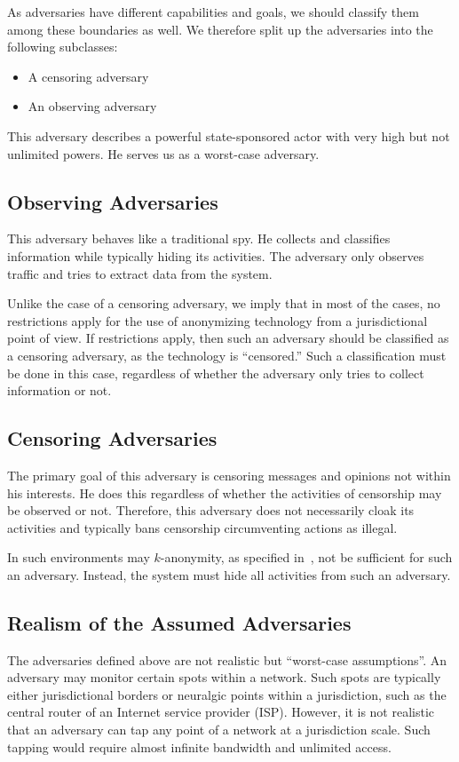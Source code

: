 As adversaries have different capabilities and goals, we should classify them among these boundaries as well. We therefore split up the adversaries into the following subclasses:
\begin{itemize}
	\item A censoring adversary
	\item An observing adversary
\end{itemize}

This adversary describes a powerful state-sponsored actor with very high but not unlimited powers. He serves us as a worst-case adversary.

\subsection{Observing Adversaries}
This adversary behaves like a traditional spy. He collects and classifies information while typically hiding its activities. The adversary only observes traffic and tries to extract data from the system.

Unlike the case of a censoring adversary, we imply that in most of the cases, no restrictions apply for the use of anonymizing technology from a jurisdictional point of view. If restrictions apply, then such an adversary should be classified as a censoring adversary, as the technology is ``censored.'' Such a classification must be done in this case, regardless of whether the adversary only tries to collect information or not.

\subsection{Censoring Adversaries}
The primary goal of this adversary is censoring messages and opinions not within his interests. He does this regardless of whether the activities of censorship may be observed or not. Therefore, this adversary does not necessarily cloak its activities and typically bans censorship circumventing actions as illegal.

In such environments may $k$-anonymity, as specified in~\cite{k-anonymous:ccs2003}, not be sufficient for such an adversary. Instead, the \MessageVortex{} system must hide all activities from such an adversary.

\subsection{Realism of the Assumed Adversaries}
The adversaries defined above are not realistic but ``worst-case assumptions''. An adversary may monitor certain spots within a network. Such spots are typically either jurisdictional borders or neuralgic points within a jurisdiction, such as the central router of an Internet service provider (ISP). However, it is not realistic that an adversary can tap any point of a network at a jurisdiction scale. Such tapping would require almost infinite bandwidth and unlimited access. 

